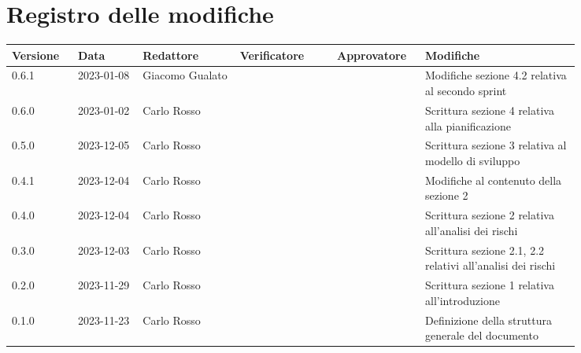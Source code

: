 \section*{Registro delle modifiche}

{
\renewcommand{\arraystretch}{1.5}
\scriptsize
\begin{longtable}{p{0.10\linewidth}p{0.10\linewidth}p{0.15\linewidth}p{0.15\linewidth}p{0.10\linewidth}p{0.24\linewidth}}
	\textbf{Versione} & \textbf{Data} & \textbf{Redattore} & \textbf{Verificatore} & \textbf{Approvatore} & \textbf{Modifiche}	\\
	\toprule
	0.6.1             & 2023-01-08    & Giacomo Gualato    & 	&	& Modifiche sezione 4.2 relativa al secondo sprint 		\\
	\hline
	0.6.0             & 2023-01-02    & Carlo Rosso        & 	&	& Scrittura sezione 4 relativa alla pianificazione 		\\
	\hline
	0.5.0             & 2023-12-05    & Carlo Rosso        & 	&	& Scrittura sezione 3 relativa al modello di sviluppo	\\
	\hline
	0.4.1             & 2023-12-04    & Carlo Rosso        & 	&	& Modifiche al contenuto della sezione 2				\\
	\hline
	0.4.0             & 2023-12-04    & Carlo Rosso        & 	&	& Scrittura sezione 2 relativa all'analisi dei rischi	\\
	\hline
	0.3.0             & 2023-12-03    & Carlo Rosso        & 	&	& Scrittura sezione 2.1, 2.2 relativi all'analisi dei rischi	\\
	\hline
	0.2.0             & 2023-11-29    & Carlo Rosso        & 	&	& Scrittura sezione 1 relativa all'introduzione			\\
	\hline
	0.1.0             & 2023-11-23    & Carlo Rosso        & 	&	& Definizione della struttura generale del documento	\\
	\bottomrule
\end{longtable}
}